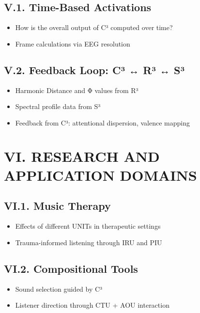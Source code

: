 \subsection*{V.1. Time-Based Activations}

\begin{itemize}
    \item How is the overall output of C³ computed over time?
    \item Frame calculations via EEG resolution
\end{itemize}

\subsection*{V.2. Feedback Loop: C³ ↔ R³ ↔ S³}

\begin{itemize}
    \item Harmonic Distance and Φ values from R³
    \item Spectral profile data from S³
    \item Feedback from C³: attentional dispersion, valence mapping
\end{itemize}

\section*{VI. RESEARCH AND APPLICATION DOMAINS}

\subsection*{VI.1. Music Therapy}

\begin{itemize}
    \item Effects of different UNITs in therapeutic settings
    \item Trauma-informed listening through IRU and PIU
\end{itemize}

\subsection*{VI.2. Compositional Tools}

\begin{itemize}
    \item Sound selection guided by C³
    \item Listener direction through CTU + AOU interaction
\end{itemize}

